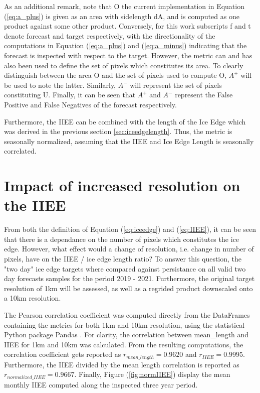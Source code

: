 \documentclass[../main/thesis.tex]{subfiles}
\begin{document}
As an additional remark, note that O the current implementation in Equation (\ref{eq:a_plus}) is given as an area with sidelength dA, and is computed as one product against some other product. Conversely, for this work subscripts f and t denote forecast and target respectively, with the directionality of the computations in Equation (\ref{eq:a_plus}) and (\ref{eq:a_minus}) indicating that the forecast is inspected with respect to the target. However, the metric can and has also been used to define the set of pixels which constitutes its area. To clearly distinguish between the area O and the set of pixels used to compute O, $A^+$ will be used to note the latter. Similarly, $A^-$ will represent the set of pixels constituting U. Finally, it can be seen that $A^+$ and $A^-$ represent the False Positive and False Negatives of the forecast respectively.

Furthermore, the IIEE can be combined with the length of the Ice Edge which was derived in the previous section \ref{sec:iceedgelength}. Thus, the metric is seasonally normalized, assuming that the IIEE and Ice Edge Length is seasonally correlated.

\section{Impact of increased resolution on the IIEE}
\label{sec:Impact of increased resolution on the IIEE}
From both the definition of Equation (\ref{eq:iceedge}) and (\ref{eq:IIEE}), it can be seen that there is a dependance on the number of pixels which constitutes the ice edge. However, what effect would a change of resolution, i.e. change in number of pixels, have on the IIEE / ice edge length ratio? To answer this question, the "two day" ice edge targets where compared against persistance on all valid two day forecasts samples for the period 2019 - 2021. Furthermore, the original target resolution of 1km will be assessed, as well as a regrided product downscaled onto a 10km resolution.

The Pearson correlation coefficient was computed directly from the DataFrames containing the metrics for both 1km and 10km resolution, using the statistical Python package Pandas \cite{reback2020pandas,mckinney-proc-scipy-2010}. For clarity, the correlation between mean\_length and IIEE for 1km and 10km was calculated. From the resulting computations, the correlation coefficient gets reported as $r_{mean\_length} = 0.9620$ and $r_{IIEE} = 0.9995$. Furthermore, the IIEE divided by the mean length correlation is reported as $r_{normalized\_IIEE} = 0.9667$. Finally, Figure (\ref{fig:normIIEE}) display the mean monthly IIEE computed along the inspected three year period.
\end{document}
